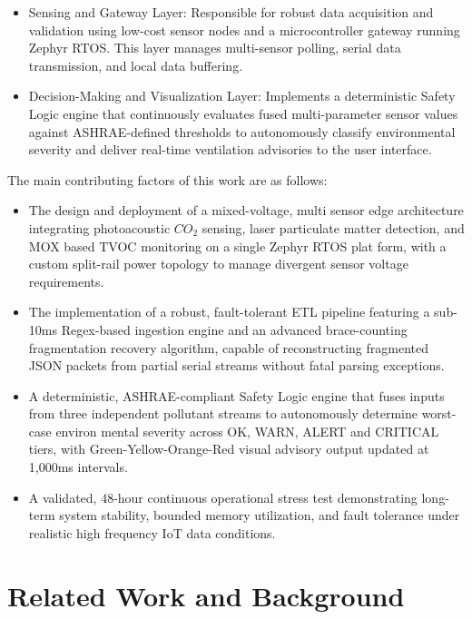 \documentclass[conference]{IEEEtran}
\begin{document}
\begin{itemize}
\item Sensing and Gateway Layer: Responsible for robust data acquisition and validation using low-cost sensor nodes and a microcontroller gateway running Zephyr RTOS. This layer manages multi-sensor polling, 
serial data transmission, and local data buffering.
\item Decision-Making and Visualization Layer: Implements a deterministic Safety Logic engine that continuously evaluates fused multi-parameter sensor values against ASHRAE-defined thresholds to autonomously classify 
environmental severity and deliver real-time ventilation advisories to the user interface.
\end{itemize}
The main contributing factors of this work are as follows:
\begin{itemize}
\item The design and deployment of a mixed-voltage, multi sensor edge architecture integrating photoacoustic $CO_2$ sensing, laser particulate matter detection, and MOX based TVOC monitoring on a single Zephyr RTOS plat form, with a custom split-rail power topology to manage divergent sensor voltage requirements.

\item The implementation of a robust, fault-tolerant ETL pipeline featuring a sub-10ms Regex-based ingestion engine and an advanced brace-counting fragmentation recovery algorithm, capable of reconstructing fragmented JSON packets from partial serial streams without fatal parsing exceptions.

\item A deterministic, ASHRAE-compliant Safety Logic engine that fuses inputs from three independent pollutant streams to autonomously determine worst-case environ mental severity across OK, WARN, ALERT and CRITICAL tiers, with Green-Yellow-Orange-Red visual advisory output updated at 1,000ms intervals.

\item A validated, 48-hour continuous operational stress test demonstrating long-term system stability, bounded memory utilization, and fault tolerance under realistic high frequency IoT data conditions.

\end{itemize}

\section{Related Work and Background}
\end{document}
